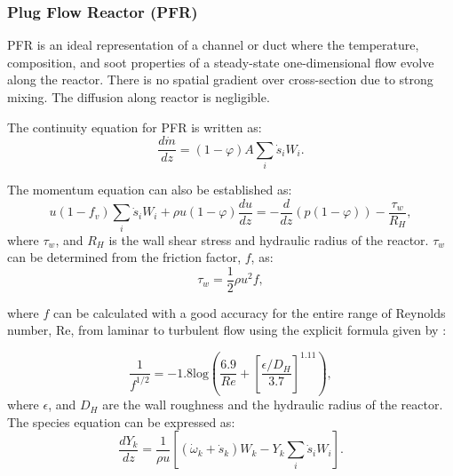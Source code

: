 \subsubsection{Plug Flow Reactor (PFR)}
\label{sec:pfr}
PFR is an ideal representation of a channel or duct where the temperature, composition, and soot properties of a steady-state one-dimensional flow evolve along the reactor. There is no spatial gradient over cross-section due to strong mixing. The diffusion along reactor is negligible.


The continuity equation for PFR is written as:
\begin{equation}
	\frac{d\dot{m}}{dz} =(1-\varphi)A \sum_i \dot s_i W_i
	\label{eqn:contpfr}.
\end{equation}

The momentum equation can also be established as:
\begin{equation}
	u (1-f_v) \sum_i \dot s_i W_i + \rho u (1-\varphi) \frac{du}{dz}
	=-\frac{d}{dz}(p(1-\varphi))-\frac{\tau_{w}}{R_H} 
	\label{eqn:momenpfr},
\end{equation}
 \noindent where $\tau_w$, and $R_H$ is the wall shear stress and hydraulic radius of the reactor. $\tau_w$ can be determined from the friction factor, $f$, as:
\begin{equation}
	\tau_w = \frac{1}{2}\rho u^2 f, 
	\label{eqn:wallshearpfr}
\end{equation}

\noindent where $f$ can be calculated with a good accuracy for the entire range of Reynolds number, Re, from laminar to turbulent flow using the explicit formula given by \citet{haaland1983simple}:

\begin{equation}
	\frac{1}{f^{1/2}} = -1.8 \mathrm{log}
	\left(
		\frac{6.9}{Re}+
		\left[ \frac{\epsilon/D_H}{3.7} \right]^{1.11}
	\right)
	\label{eqn:fpfr},
\end{equation}
\noindent where $\epsilon$, and ${D_H}$ are the wall roughness and the hydraulic radius of the reactor. The species equation can be expressed as:
\begin{equation}
	\frac{d Y_k}{d z}=\frac{1}{\rho u}\left[\left(\dot{\omega}_k+\dot{s}_k\right) W_k-Y_k \sum_i \dot{s}_i W_i\right]
	\label{eqn:speciespfr}.
\end{equation}

